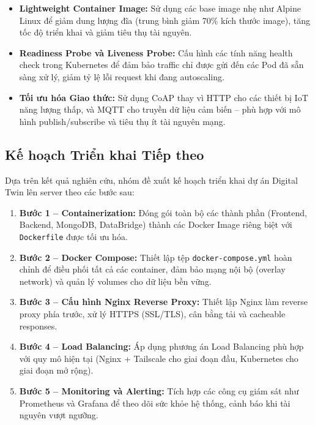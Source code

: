 \documentclass[twocolumn]{article}
\begin{document}
\begin{itemize}
	\item \textbf{Lightweight Container Image:} Sử dụng các base image nhẹ như Alpine Linux để giảm dung lượng đĩa (trung bình giảm 70\% kích thước image), tăng tốc độ triển khai và giảm tiêu thụ tài nguyên.
	
	\item \textbf{Readiness Probe và Liveness Probe:} Cấu hình các tính năng health check trong Kubernetes để đảm bảo traffic chỉ được gửi đến các Pod đã sẵn sàng xử lý, giảm tỷ lệ lỗi request khi đang autoscaling.
	
	\item \textbf{Tối ưu hóa Giao thức:} Sử dụng CoAP thay vì HTTP cho các thiết bị IoT năng lượng thấp, và MQTT cho truyền dữ liệu cảm biến -- phù hợp với mô hình publish/subscribe và tiêu thụ ít tài nguyên mạng.
\end{itemize}

\subsection{Kế hoạch Triển khai Tiếp theo}
Dựa trên kết quả nghiên cứu, nhóm đề xuất kế hoạch triển khai dự án Digital Twin lên server theo các bước sau:

\begin{enumerate}
	\item \textbf{Bước 1 -- Containerization:} Đóng gói toàn bộ các thành phần (Frontend, Backend, MongoDB, DataBridge) thành các Docker Image riêng biệt với \texttt{Dockerfile} được tối ưu hóa.
	
	\item \textbf{Bước 2 -- Docker Compose:} Thiết lập tệp \texttt{docker-compose.yml} hoàn chỉnh để điều phối tất cả các container, đảm bảo mạng nội bộ (overlay network) và quản lý volumes cho dữ liệu bền vững.
	
	\item \textbf{Bước 3 -- Cấu hình Nginx Reverse Proxy:} Thiết lập Nginx làm reverse proxy phía trước, xử lý HTTPS (SSL/TLS), cân bằng tải và cacheable responses.
	
	\item \textbf{Bước 4 -- Load Balancing:} Áp dụng phương án Load Balancing phù hợp với quy mô hiện tại (Nginx + Tailscale cho giai đoạn đầu, Kubernetes cho giai đoạn mở rộng).
	
	\item \textbf{Bước 5 -- Monitoring và Alerting:} Tích hợp các công cụ giám sát như Prometheus và Grafana để theo dõi sức khỏe hệ thống, cảnh báo khi tài nguyên vượt ngưỡng.
\end{enumerate}
\end{document}
